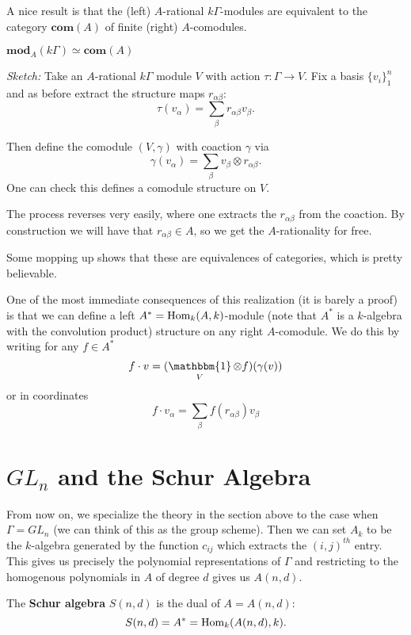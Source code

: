 \documentclass[12pt]{article}
\DeclareMathOperator{\1}{\mathbbm{1}}
\begin{document}
A nice result is that the (left) $A$-rational $k\Gamma$-modules are equivalent to the category $\mathbf{com}(A)$ of finite (right) $A$-comodules.
\begin{prop}
	$\mathbf{mod}_A(k\Gamma)\simeq \mathbf{com}(A)$
\end{prop}
\begin{prf}
	\textit{Sketch:} Take an $A$-rational $k\Gamma$ module $V$ with action $\tau:\Gamma\to V$. Fix a basis $\{v_i\}_1^n$
	and as before extract the structure maps $r_{\alpha\beta}$:
	\[\tau(v_\alpha)=\sum_\beta r_{\alpha\beta} v_\beta.\]
	
	Then define the comodule $(V,\gamma)$ with coaction $\gamma$ via 
	\[\gamma(v_\alpha)=\sum_\beta v_\beta\otimes r_{\alpha\beta}.\]
	One can check this defines a comodule structure on $V$. 

	The process reverses very easily, where one extracts the $r_{\alpha\beta}$ from the coaction.
	By construction we will have that $r_{\alpha\beta}\in A$, so we get the $A$-rationality for free.

	Some mopping up shows that these are equivalences of categories, which is pretty believable. 
\end{prf}	
\begin{rmk}
	One of the most immediate consequences of this realization (it is barely a proof) is that we can define a left $A^\ast=\operatorname{Hom}_k(A,k)$-module (note that $A^\ast$ is a $k$-algebra with the convolution product)
	structure on any right $A$-comodule. We do this by writing for any $f\in A^\ast$
	\[f\cdot v=(\1_V\otimes f)(\gamma(v))\]
	or in coordinates 
	\[f\cdot v_\alpha=\sum_\beta f(r_{\alpha\beta})v_\beta\]
\end{rmk}

\section{\texorpdfstring{$GL_n$}{GLn} and the Schur Algebra}
From now on, we specialize the theory in the section above to the case when $\Gamma=GL_n$ (we can think of this as the group scheme). 
Then we can set $A_k$ to be the $k$-algebra generated by the function $c_{ij}$ which extracts the $(i,j)^{th}$ entry.
This gives us precisely the polynomial representations of $\Gamma$ and restricting to the homogenous polynomials in $A$ of degree $d$
gives us $A(n,d)$.

\begin{defn}
	The \textbf{Schur algebra} $S(n,d)$ is the dual of $A=A(n,d):$
	\[S(n,d)=A^\ast=\operatorname{Hom}_k(A(n,d),k).\]
\end{defn}

\medskip

\printbibliography
\end{document}
